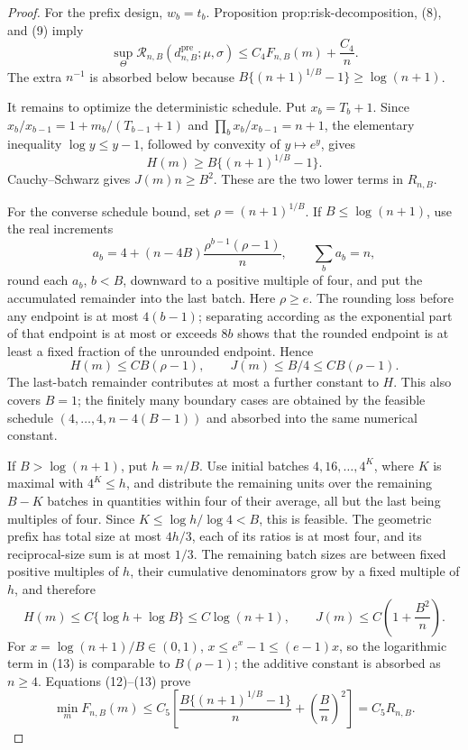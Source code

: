 \documentclass{article}
\begin{document}
\begin{proof}
For the prefix design, \(w_b=t_b\).  Proposition prop:risk-decomposition, (8), and (9) imply
\[
\sup_\Theta\mathcal R_{n,B}(d^{\mathrm{pre}}_{n,B};\mu,\sigma)
\leq C_4F_{n,B}(m)+\frac{C_4}{n}.                           \tag{10}
\]
The extra \(n^{-1}\) is absorbed below because \(B\{(n+1)^{1/B}-1\}\geq\log(n+1)\).

It remains to optimize the deterministic schedule.  Put \(x_b=T_b+1\).  Since
\(x_b/x_{b-1}=1+m_b/(T_{b-1}+1)\) and \(\prod_bx_b/x_{b-1}=n+1\), the elementary inequality
\(\log y\leq y-1\), followed by convexity of \(y\mapsto e^y\), gives
\[
H(m)\geq B\{(n+1)^{1/B}-1\}.                               \tag{11}
\]
Cauchy--Schwarz gives \(J(m)n\geq B^2\).  These are the two lower terms in \(R_{n,B}\).

For the converse schedule bound, set \(\rho=(n+1)^{1/B}\).  If
\(B\leq\log(n+1)\), use the real increments
\[
a_b=4+(n-4B)\frac{\rho^{b-1}(\rho-1)}{n},\qquad \sum_ba_b=n,
\]
round each \(a_b\), \(b<B\), downward to a positive multiple of four, and put the accumulated remainder into the last batch.  Here \(\rho\geq e\).  The rounding loss before any endpoint is at most \(4(b-1)\); separating according as the exponential part of that endpoint is at most or exceeds \(8b\) shows that the rounded endpoint is at least a fixed fraction of the unrounded endpoint.  Hence
\[
H(m)\leq C B(\rho-1),\qquad
J(m)\leq B/4\leq C B(\rho-1).                              \tag{12}
\]
The last-batch remainder contributes at most a further constant to \(H\).  This also covers \(B=1\); the finitely many boundary cases are obtained by the feasible schedule \((4,\ldots,4,n-4(B-1))\) and absorbed into the same numerical constant.

If \(B>\log(n+1)\), put \(h=n/B\).  Use initial batches \(4,16,\ldots,4^K\), where \(K\) is maximal with \(4^K\leq h\), and distribute the remaining units over the remaining \(B-K\) batches in quantities within four of their average, all but the last being multiples of four.  Since
\(K\leq\log h/\log4<B\), this is feasible.  The geometric prefix has total size at most \(4h/3\), each of its ratios is at most four, and its reciprocal-size sum is at most \(1/3\).  The remaining batch sizes are between fixed positive multiples of \(h\), their cumulative denominators grow by a fixed multiple of \(h\), and therefore
\[
H(m)\leq C\{\log h+\log B\}\leq C\log(n+1),
\qquad
J(m)\leq C\left(1+\frac{B^2}{n}\right).                   \tag{13}
\]
For \(x=\log(n+1)/B\in(0,1)\),
\(x\leq e^x-1\leq(e-1)x\), so the logarithmic term in (13) is comparable to \(B(\rho-1)\); the additive constant is absorbed as \(n\geq4\).  Equations (12)--(13) prove
\[
\min_mF_{n,B}(m)\leq C_5\left[
 \frac{B\{(n+1)^{1/B}-1\}}n+\left(\frac Bn\right)^2\right]
=C_5R_{n,B}.                                                 \tag{14}
\]


\end{proof}
\end{document}
